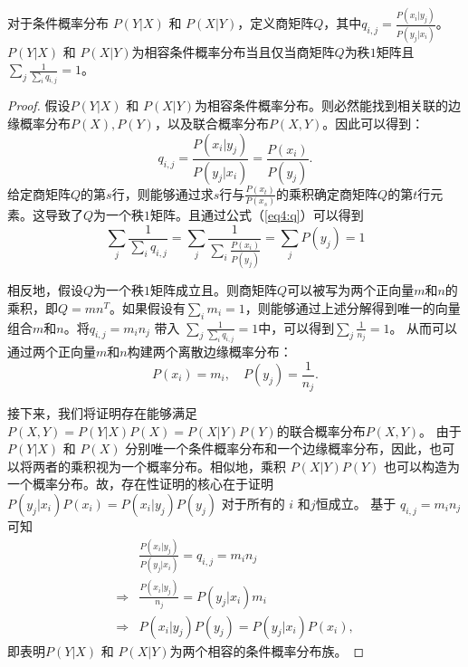 \begin{theorem}
    \label{thm4}
    对于条件概率分布 $P(Y|X)$ 和 $P(X|Y)$，定义商矩阵$Q$，其中${q}_{i,j} = \frac{P(x_i|y_j)}{P(y_j|x_i)}$。$P(Y|X)$ 和 $P(X|Y)$为相容条件概率分布当且仅当商矩阵$Q$为秩$1$矩阵且$\sum_j\frac{1}{\sum_i {q}_{i,j}} = 1$。
\end{theorem}
\begin{proof}
    假设$P(Y|X)$ 和 $P(X|Y)$为相容条件概率分布。则必然能找到相关联的边缘概率分布$P(X), P(Y)$，以及联合概率分布$P(X, Y)$。因此可以得到：
    \begin{equation}
    {q}_{i,j} = \frac{P(x_i|y_j)}{P(y_j|x_i)} = \frac{P(x_i)}{P(y_j)}.
    \label{eq4:q}
    \end{equation}
    给定商矩阵$Q$的第$s$行，则能够通过求$s$行与$\frac{P(x_t)}{P(x_s)}$的乘积确定商矩阵$Q$的第$t$行元素。这导致了$Q$为一个秩$1$矩阵。且通过公式（\ref{eq4:q}）可以得到
    \begin{equation}
    \sum_j\frac{1}{\sum_i {q}_{i,j}} = \sum_j\frac{1}{\sum_i \frac{P(x_i)}{P(y_j)}} = \sum_j P(y_j) = 1  
    \end{equation}

    相反地，假设$Q$为一个秩$1$矩阵成立且。则商矩阵$Q$可以被写为两个正向量$m$和$n$的乘积，即$Q = mn^T$。如果假设有$\sum_i  {m}_i = 1$，则能够通过上述分解得到唯一的向量组合$m$和$n$。将${q}_{i,j} ={ m}_i{n}_j$ 带入 $\sum_j\frac{1}{\sum_i {q}_{i,j}} = 1$中，可以得到$\sum_j\frac{1}{{n}_j} = 1$。
    从而可以通过两个正向量$m$和$n$构建两个离散边缘概率分布：
    \begin{equation}
    P(x_i) = {m}_i, \quad P(y_j) = \frac{1}{{n}_j}.
    \end{equation}

    接下来，我们将证明存在能够满足 $P(X, Y) = P(Y|X)P(X) = P(X|Y)P(Y)$的联合概率分布$P(X, Y)$。
    由于$P(Y|X)$ 和 $P(X)$ 分别唯一个条件概率分布和一个边缘概率分布，因此，也可以将两者的乘积视为一个概率分布。相似地，乘积 $P(X|Y)P(Y)$ 也可以构造为一个概率分布。故，存在性证明的核心在于证明 $P(y_j|x_i)P(x_i) = P(x_i|y_j)P(y_j)$ 对于所有的 $i$ 和$j$恒成立。
    基于 ${q}_{i,j} = {m}_i{n}_j$可知
    \begin{equation}
    \begin{split}
    &\frac{P(x_i|y_j)}{P(y_j|x_i)} = {q}_{i,j} = {m}_i{n}_j\\
    \Rightarrow &\frac{P(x_i|y_j)}{{n}_j} = P(y_j|x_i) {m}_i\\
    \Rightarrow &P(x_i|y_j)P(y_j) = P(y_j|x_i)P(x_i), 
    \end{split}
    \end{equation}
    即表明$P(Y|X)$ 和 $P(X|Y)$为两个相容的条件概率分布族。
\end{proof}

